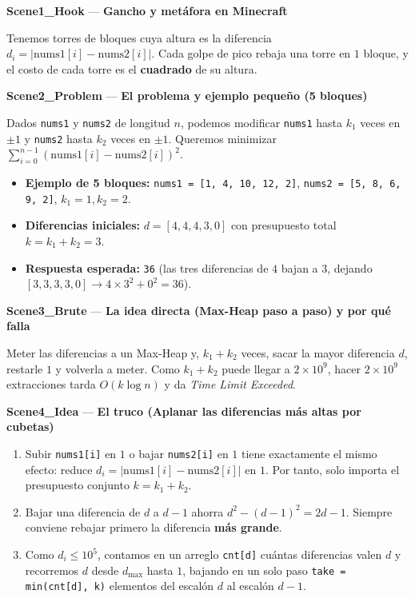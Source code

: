 \documentclass[letterpaper,10pt]{article}
\newcommand{\scene}[2]{\noindent\textbf{\textcolor{mcaqua}{#1}} --- \textbf{#2}\par\vspace{1pt}}
\begin{document}
\begin{shaded}
\scene{Scene1\_Hook}{Gancho y met\'afora en Minecraft}
Tenemos torres de bloques cuya altura es la diferencia $d_i = |\text{nums1}[i] - \text{nums2}[i]|$. Cada golpe de pico rebaja una torre en $1$ bloque, y el costo de cada torre es el \textbf{cuadrado} de su altura.

\scene{Scene2\_Problem}{El problema y ejemplo peque\~no (5 bloques)}
Dados \texttt{nums1} y \texttt{nums2} de longitud $n$, podemos modificar \texttt{nums1} hasta $k_1$ veces en $\pm 1$ y \texttt{nums2} hasta $k_2$ veces en $\pm 1$. Queremos minimizar $\sum_{i=0}^{n-1} (\text{nums1}[i] - \text{nums2}[i])^2$.
\begin{itemize}\setlength{\itemsep}{1pt}
  \item \textbf{Ejemplo de 5 bloques:} \texttt{nums1 = [1, 4, 10, 12, 2]}, \texttt{nums2 = [5, 8, 6, 9, 2]}, $k_1 = 1, k_2 = 2$.
  \item \textbf{Diferencias iniciales:} $d = [4, 4, 4, 3, 0]$ con presupuesto total $k = k_1 + k_2 = 3$.
  \item \textbf{Respuesta esperada:} \texttt{36} (las tres diferencias de $4$ bajan a $3$, dejando $[3, 3, 3, 3, 0] \to 4 \times 3^2 + 0^2 = 36$).
\end{itemize}

\scene{Scene3\_Brute}{La idea directa (Max-Heap paso a paso) y por qu\'e falla}
Meter las diferencias a un Max-Heap y, $k_1 + k_2$ veces, sacar la mayor diferencia $d$, restarle $1$ y volverla a meter. Como $k_1 + k_2$ puede llegar a $2 \times 10^9$, hacer $2 \times 10^9$ extracciones tarda $O(k \log n)$ y da \textit{Time Limit Exceeded}.

\scene{Scene4\_Idea}{El truco (Aplanar las diferencias m\'as altas por cubetas)}
\begin{enumerate}\setlength{\itemsep}{1pt}
  \item Subir \texttt{nums1[i]} en $1$ o bajar \texttt{nums2[i]} en $1$ tiene exactamente el mismo efecto: reduce $d_i = |\text{nums1}[i] - \text{nums2}[i]|$ en $1$. Por tanto, solo importa el presupuesto conjunto $k = k_1 + k_2$.
  \item Bajar una diferencia de $d$ a $d-1$ ahorra $d^2 - (d-1)^2 = 2d - 1$. Siempre conviene rebajar primero la diferencia \textbf{m\'as grande}.
  \item Como $d_i \le 10^5$, contamos en un arreglo \texttt{cnt[d]} cu\'antas diferencias valen $d$ y recorremos $d$ desde $d_{\max}$ hasta $1$, bajando en un solo paso \texttt{take = min(cnt[d], k)} elementos del escal\'on $d$ al escal\'on $d-1$.
\end{enumerate}


\end{shaded}
\end{document}
